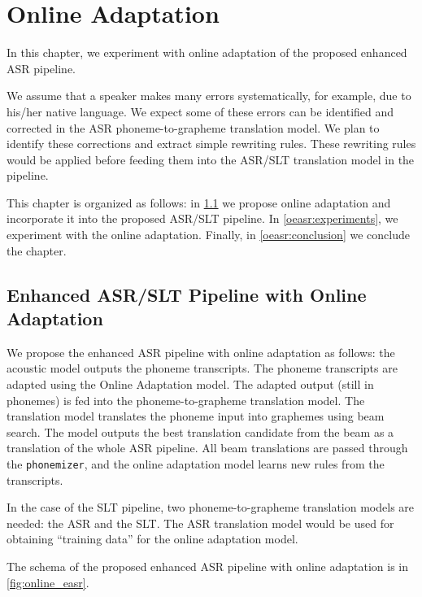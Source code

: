\chapter{Online Adaptation}
\label{chap:adaptation}
In this chapter, we experiment with online adaptation of the proposed enhanced ASR pipeline.

We assume that a speaker makes many errors systematically, for example, due to his/her native language. We expect some of these errors can be identified and corrected in the ASR phoneme-to-grapheme translation model. We plan to identify these corrections and extract simple rewriting rules. These rewriting rules would be applied before feeding them into the ASR/SLT translation model in the pipeline.

This chapter is organized as follows: in \cref{oeasr:model} we propose online adaptation and incorporate it into the proposed ASR/SLT pipeline. In \cref{oeasr:experiments}, we experiment with the online adaptation. Finally, in \cref{oeasr:conclusion} we conclude the chapter.

\section{Enhanced ASR/SLT Pipeline with Online Adaptation}
\label{oeasr:model}
We propose the enhanced ASR pipeline with online adaptation as follows: the acoustic model outputs the phoneme transcripts. The phoneme transcripts are adapted using the Online Adaptation model. The adapted output (still in phonemes) is fed into the phoneme-to-grapheme translation model. The translation model translates the phoneme input into graphemes using beam search. The model outputs the best translation candidate from the beam as a translation of the whole ASR pipeline. All beam translations are passed through the \texttt{phonemizer}, and the online adaptation model learns new rules from the transcripts.

In the case of the SLT pipeline, two phoneme-to-grapheme translation models are needed: the ASR and the SLT. The ASR translation model would be used for obtaining ``training data'' for the online adaptation model.

The schema of the proposed enhanced ASR pipeline with online adaptation is in \cref{fig:online_easr}.

